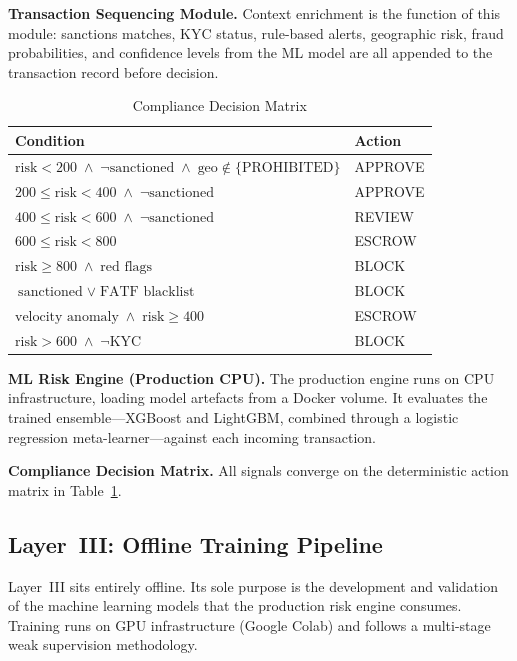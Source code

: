 \documentclass[journal]{IEEEtran}
\begin{document}
\textbf{Transaction Sequencing Module.} Context enrichment is the function of this module: sanctions matches, KYC status, rule-based alerts, geographic risk, fraud probabilities, and confidence levels from the ML model are all appended to the transaction record before decision.

\begin{table}[!t]
\centering
\caption{Compliance Decision Matrix}
\label{tab:decision_matrix}
\begin{tabular}{p{5.2cm}l}
\toprule
\textbf{Condition} & \textbf{Action} \\
\midrule
$\text{risk} < 200 \;\wedge\; \neg\text{sanctioned} \;\wedge\; \text{geo} \notin \{\text{PROHIBITED}\}$ & APPROVE \\
$200 \le \text{risk} < 400 \;\wedge\; \neg\text{sanctioned}$ & APPROVE \\
$400 \le \text{risk} < 600 \;\wedge\; \neg\text{sanctioned}$ & REVIEW \\
$600 \le \text{risk} < 800$ & ESCROW \\
$\text{risk} \ge 800 \;\wedge\; \text{red flags}$ & BLOCK \\
$\text{sanctioned} \;\vee\; \text{FATF blacklist}$ & BLOCK \\
$\text{velocity anomaly} \;\wedge\; \text{risk} \ge 400$ & ESCROW \\
$\text{risk} > 600 \;\wedge\; \neg\text{KYC}$ & BLOCK \\
\bottomrule
\end{tabular}
\end{table}

\textbf{ML Risk Engine (Production CPU).} The production engine runs on CPU infrastructure, loading model artefacts from a Docker volume. It evaluates the trained ensemble---XGBoost and LightGBM, combined through a logistic regression meta-learner---against each incoming transaction.

\textbf{Compliance Decision Matrix.} All signals converge on the deterministic action matrix in Table~\ref{tab:decision_matrix}.

\subsection{Layer~III: Offline Training Pipeline}

Layer~III sits entirely offline. Its sole purpose is the development and validation of the machine learning models that the production risk engine consumes. Training runs on GPU infrastructure (Google Colab) and follows a multi-stage weak supervision methodology.
\end{document}
